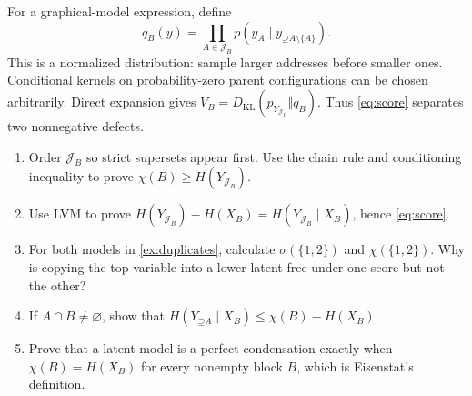\documentclass[11pt]{article}
\newcommand{\Up}{\mathord{\supseteq}}
\begin{document}
For a graphical-model expression, define
\[
 q_B(y)=\prod_{A\in\mathcal{J}_B}
 p(y_A\mid y_{\Up A\setminus\{A\}}).
\]
This is a normalized distribution: sample larger addresses before smaller
ones. Conditional kernels on probability-zero parent configurations can be
chosen arbitrarily. Direct expansion gives
$V_B=D_{\mathrm{KL}}(p_{Y_{\mathcal{J}_B}}\Vert q_B)$.
Thus \eqref{eq:score} separates two nonnegative defects.

\begin{exercise}
\label{ex:scores}
\begin{enumerate}
\item Order $\mathcal{J}_B$ so strict supersets appear first. Use the chain rule
and conditioning inequality to prove $\chi(B)\ge H(Y_{\mathcal{J}_B})$.
\item Use LVM to prove
$H(Y_{\mathcal{J}_B})-H(X_B)=H(Y_{\mathcal{J}_B}\mid X_B)$, hence
\eqref{eq:score}.
\item For both models in \cref{ex:duplicates}, calculate $\sigma(\{1,2\})$ and
$\chi(\{1,2\})$. Why is copying the top variable into a lower latent free
under one score but not the other?
\item If $A\cap B\ne\varnothing$, show that
$H(Y_{\Up A}\mid X_B)\le\chi(B)-H(X_B)$.
\item Prove that a latent model is a perfect condensation exactly when
$\chi(B)=H(X_B)$ for every nonempty block $B$, which is Eisenstat's definition.
\end{enumerate}
\end{exercise}
\end{document}
